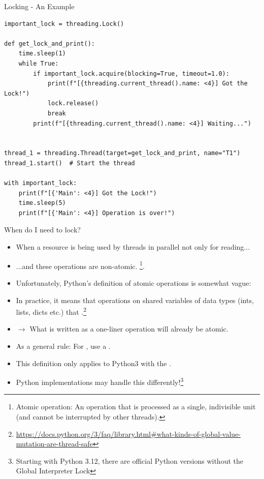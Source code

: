 \documentclass[12pt, aspectratio=169, usepdftitle=false, handout]{beamer}
\newcommand{\pp}[1]{\lpl{#1}}
\begin{document}
\begin{frame}[fragile]{Locking - An Example}
	\begin{lstlisting}[language=pytiny]
important_lock = threading.Lock()

def get_lock_and_print():
    time.sleep(1)
    while True:
        if important_lock.acquire(blocking=True, timeout=1.0):
            print(f"[{threading.current_thread().name: <4}] Got the Lock!")
            lock.release()
            break
        print(f"[{threading.current_thread().name: <4}] Waiting...")


thread_1 = threading.Thread(target=get_lock_and_print, name="T1")
thread_1.start()  # Start the thread

with important_lock:
    print(f"[{'Main': <4}] Got the Lock!")
    time.sleep(5)
    print(f"[{'Main': <4}] Operation is over!")
	\end{lstlisting}
\end{frame}


\begin{frame}[fragile]{When do I need to lock?}
	\begin{itemize}

		\item When a resource is being used by  threads in parallel not only for reading...
		\item[] ...and these operations are non-atomic.
		\footnote{Atomic operation: An operation that is processed as a single, indivisible unit (and cannot be interrupted by other threads).}.
		\pause
		
		\item Unfortunately, Python’s definition of atomic operations is somewhat vague:
		\item[] \glqq In practice, it means that operations on shared variables of  data types (ints, lists, dicts etc.) that .\grqq\footnote{\url{https://docs.python.org/3/faq/library.html\#what-kinds-of-global-value-mutation-are-thread-safe}}
		\item[] $\rightarrow$ What is written as a one-liner operation will already be atomic.
		
		\pause
		\item As a general rule: For , use a .
		\item[] This definition only applies to Python3 with the \pp{global interpreter lock}.
		\item[]  Python implementations may handle this differently!\footnote{Starting with Python 3.12, there are official Python versions without the Global Interpreter Lock}
	\end{itemize}
\end{frame}
\end{document}
